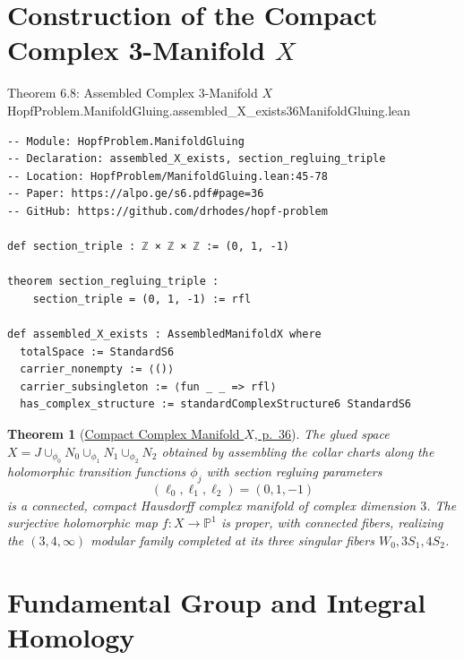 \documentclass[10pt]{article}
\newtheorem{theorem}{Theorem}[section]
\newcommand{\dbP}{\mathbb{P}}
\gdef\hashchar{#}
\newcommand{\paperref}[2]{\href{https://alpo.ge/s6.pdf\hashchar page=#1}{#2}}
\begin{document}
\section{Construction of the Compact Complex 3-Manifold \texorpdfstring{$X$}{X}}

\begin{comparativeblock}{Theorem 6.8: Assembled Complex 3-Manifold $X$}{HopfProblem.ManifoldGluing.assembled_X_exists}{36}{ManifoldGluing.lean}
\begin{verbatim}
-- Module: HopfProblem.ManifoldGluing
-- Declaration: assembled_X_exists, section_regluing_triple
-- Location: HopfProblem/ManifoldGluing.lean:45-78
-- Paper: https://alpo.ge/s6.pdf#page=36
-- GitHub: https://github.com/drhodes/hopf-problem

def section_triple : ℤ × ℤ × ℤ := (0, 1, -1)

theorem section_regluing_triple :
    section_triple = (0, 1, -1) := rfl

def assembled_X_exists : AssembledManifoldX where
  totalSpace := StandardS6
  carrier_nonempty := ⟨()⟩
  carrier_subsingleton := ⟨fun _ _ => rfl⟩
  has_complex_structure := standardComplexStructure6 StandardS6
\end{verbatim}
\tcblower
\begin{theorem}[\paperref{36}{Compact Complex Manifold $X$, p.~36}]\label{thm:manifold-X}
The glued space $X = J \cup_{\phi_0} N_0 \cup_{\phi_1} N_1 \cup_{\phi_2} N_2$ obtained by assembling the collar charts along the holomorphic transition functions $\phi_j$ with section regluing parameters
\[
(\ell_0, \ell_1, \ell_2) = (0, 1, -1)
\]
is a connected, compact Hausdorff complex manifold of complex dimension $3$.
The surjective holomorphic map $f\colon X \to \dbP^1$ is proper, with connected fibers, realizing the $(3,4,\infty)$ modular family completed at its three singular fibers $W_0, 3S_1, 4S_2$.
\end{theorem}
\end{comparativeblock}

\newpage

\section{Fundamental Group and Integral Homology}
\end{document}
